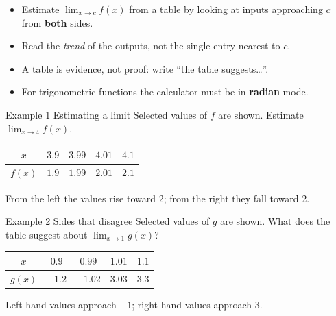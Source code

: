 \documentclass[11pt]{article}
\begin{document}

\begin{ideabox}
\begin{itemize}[leftmargin=*,itemsep=2pt,topsep=2pt]
  \item Estimate $\displaystyle\lim_{x\to c}f(x)$ from a table by looking at inputs approaching $c$ from \textbf{both} sides.
  \item Read the \emph{trend} of the outputs, not the single entry nearest to $c$.
  \item A table is evidence, not proof: write \textquotedblleft{}the table suggests\ldots\textquotedblright{}.
  \item For trigonometric functions the calculator must be in \textbf{radian} mode.
\end{itemize}
\end{ideabox}

\begin{example}{Example 1 \textperiodcentered{} Estimating a limit}
Selected values of $f$ are shown. Estimate $\displaystyle\lim_{x\to 4}f(x)$.\begin{center}\renewcommand{\arraystretch}{1.25}\begin{tabular}{|c|c|c|c|c|}\hline $x$ & $3.9$ & $3.99$ & $4.01$ & $4.1$ \\ \hline $f(x)$ & $1.9$ & $1.99$ & $2.01$ & $2.1$ \\ \hline\end{tabular}\end{center}\soln From the left the values rise toward 2; from the right they fall toward 2.
\end{example}

\begin{example}{Example 2 \textperiodcentered{} Sides that disagree}
Selected values of $g$ are shown. What does the table suggest about $\displaystyle\lim_{x\to 1}g(x)$?\begin{center}\renewcommand{\arraystretch}{1.25}\begin{tabular}{|c|c|c|c|c|}\hline $x$ & $0.9$ & $0.99$ & $1.01$ & $1.1$ \\ \hline $g(x)$ & $-1.2$ & $-1.02$ & $3.03$ & $3.3$ \\ \hline\end{tabular}\end{center}\soln Left-hand values approach $-1$; right-hand values approach $3$.
\end{example}
\end{document}
